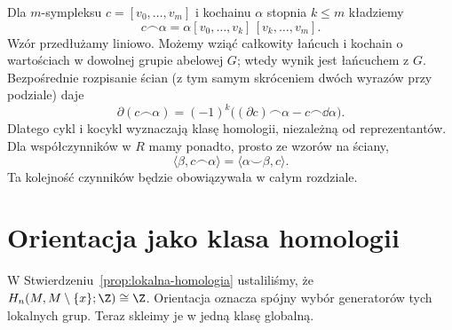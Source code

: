 \begin{definicja}
\label{def:kapowy-16}
Dla $m$-sympleksu $c=[v_0,\ldots,v_m]$ i kochainu
$\alpha$ stopnia $k\leq m$ kładziemy
\[
 c\frown\alpha=\alpha[v_0,\ldots,v_k]\,[v_k,\ldots,v_m].
\]
Wzór przedłużamy liniowo. Możemy wziąć całkowity łańcuch
i kochain o wartościach w dowolnej grupie abelowej $G$;
wtedy wynik jest łańcuchem z $G$. Bezpośrednie rozpisanie
ścian (z tym samym skróceniem dwóch wyrazów przy podziale)
daje
\begin{equation}\label{eq:kapowy-brzeg-16}
 \partial(c\frown\alpha)=(-1)^k
  \bigl((\partial c)\frown\alpha-c\frown\dd\alpha\bigr).
\end{equation}
Dlatego cykl i kocykl wyznaczają klasę homologii,
niezależną od reprezentantów. Dla współczynników w $R$
mamy ponadto, prosto ze wzorów na ściany,
\[
 \langle\beta,c\frown\alpha\rangle
 =\langle\alpha\smile\beta,c\rangle.
\]
Ta kolejność czynników będzie obowiązywała w całym rozdziale.
\end{definicja}

\section{Orientacja jako klasa homologii}
\label{sec:klasa-fundamentalna-16}

W Stwierdzeniu~\ref{prop:lokalna-homologia}
ustaliliśmy, że
$H_n(M,M\setminus\{x\};\Z)\cong\Z$.
Orientacja oznacza spójny wybór
generatorów tych lokalnych grup.
Teraz skleimy je w jedną klasę
globalną.

